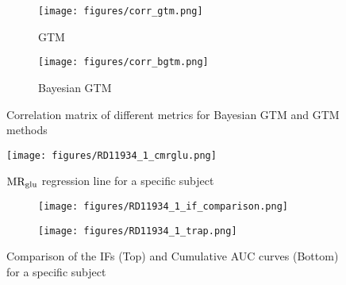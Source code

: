 \begin{figure}[h]
	\centering
	\begin{subfigure}{0.45\textwidth}
		\texttt{[image: figures/corr\_gtm.png]}
		\caption{GTM}
		\label{subfig:corr_gtm}
	\end{subfigure}
	\begin{subfigure}{0.45\textwidth}
		\texttt{[image: figures/corr\_bgtm.png]}
		\caption{Bayesian GTM}
		\label{subfig:corr_bgtm}
	\end{subfigure}
	\label{fig:corr_mat}
	\caption{Correlation matrix of different metrics for Bayesian GTM and GTM methods}
\end{figure}
\begin{figure}
	\centering
	\texttt{[image: figures/RD11934\_1\_cmrglu.png]}
	\caption{\(\text{MR}_{\text{glu}}\) regression line for a specific subject}
\end{figure}
\begin{figure}
	\centering
	\begin{subfigure}{\textwidth}
		\texttt{[image: figures/RD11934\_1\_if\_comparison.png]}
		\label{subfig:if_compare}
	\end{subfigure}
	\begin{subfigure}{\textwidth}
		\texttt{[image: figures/RD11934\_1\_trap.png]}
		\label{subfig:trap_compare}
	\end{subfigure}
	\label{fig:ifs}
	\caption{Comparison of the IFs (Top) and Cumulative AUC curves (Bottom) for a specific subject}
\end{figure}



